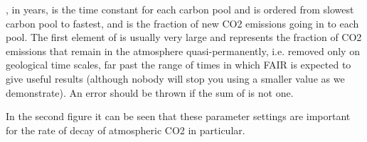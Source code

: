 \documentclass[letterpaper,10pt,english]{sphinxmanual}
\begin{document}
, in years, is the time constant for each carbon pool and is
ordered from slowest carbon pool to fastest, and  is the fraction
of new CO2 emissions going in to each pool. The first element of 
is usually very large and represents the fraction of CO2 emissions that
remain in the atmosphere \sphinxquotedblleft{}quasi-permanently\sphinxquotedblright{}, i.e. removed only on
geological time scales, far past the range of times in which FAIR is
expected to give useful results (although nobody will stop you using a
smaller value as we demonstrate). An error should be thrown if the sum
of  is not one.

In the second figure it can be seen that these parameter settings are
important for the rate of decay of atmospheric CO2 in particular.
\end{document}
